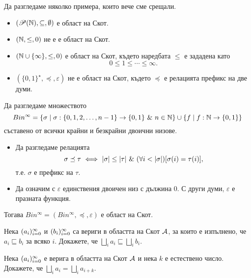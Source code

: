 
\begin{example}
  Да разгледаме няколко примера, които вече сме срещали.
  \begin{itemize}
  \item
    $(\mathscr{P}(\mathbb{N}),\subseteq,\emptyset)$ е област на Скот.
  \item
    $(\mathbb{N}, \leq, 0)$ не е е област на Скот.
  \item
    $(\mathbb{N}\cup\{\infty\}, \leq, 0)$ е област на Скот, където наредбата $\leq$ е зададена като
    \[0 \leq 1 \leq \cdots \leq \infty.\]
  \item
    $(\{0,1\}^\star, \preceq, \varepsilon)$ не е област на Скот, където $\preceq$ е релацията префикс на две думи.
  \end{itemize}
\end{example}

\begin{example}
  Да разгледаме множеството 
  \[Bin^\infty = \{\sigma \mid \sigma :\{0,1,2,\dots,n-1\} \to \{0,1\}\ \&\ n \in \mathbb{N}\} \cup 
  \{f \mid f:\mathbb{N} \to \{0,1\}\}\]
  съставено от всички крайни и безкрайни двоични низове.
  \begin{itemize}
  \item
    Да разгледаме релацията
    \[\sigma \preceq \tau \ \Longleftrightarrow\  \vert{\sigma}\vert \leq \vert{\tau}\vert\ \&\ (\forall i < |\sigma|)[\sigma(i) = \tau(i)],\]
    т.е. $\sigma$ е префикс на $\tau$.    
  \item
    Да означим с $\varepsilon$ единствения двоичен низ с дължина $0$. С други думи, $\varepsilon$ е празната функция.
  \end{itemize}
  Тогава $Bin^\infty = (Bin^\infty,\preceq,\varepsilon)$ е област на Скот.
\end{example}

\begin{problem}
  Нека $(a_{i})^{\infty}_{i=0}$ и $(b_{i})^{\infty}_{i=0}$ са вериги в областта на Скот $\mathcal{A}$, за които е изпълнено, че
  $a_i \sqsubseteq b_i$ за всяко $i$.
  Докажете, че $\bigsqcup_i a_i \sqsubseteq \bigsqcup_i b_i$.
\end{problem}

\begin{problem}
  Нека $(a_{i})^{\infty}_{i=0}$ е верига в областта на Скот $\mathcal{A}$ и нека $k$ е естествено число.
  Докажете, че $\bigsqcup_i a_i = \bigsqcup_i a_{i+k}$.
\end{problem}

